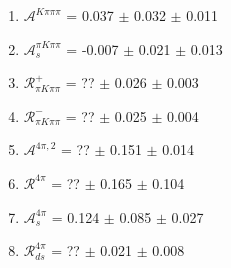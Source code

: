 \begin{enumerate}
\item $\mathcal{A}^{K\pi\pi\pi}$ = 0.037 $\pm$ 0.032 $\pm$ 0.011
\item $\mathcal{A}_s^{\pi K\pi\pi}$ = -0.007 $\pm$ 0.021 $\pm$ 0.013
\item $\mathcal{R}_{\pi K\pi\pi}^+$ = ?? $\pm$ 0.026 $\pm$ 0.003
\item $\mathcal{R}_{\pi K\pi\pi}^-$ = ?? $\pm$ 0.025 $\pm$ 0.004
\item $\mathcal{A}^{4\pi,2}$ = ?? $\pm$ 0.151 $\pm$ 0.014
\item $\mathcal{R}^{4\pi}$ = ?? $\pm$ 0.165 $\pm$ 0.104
\item $\mathcal{A}_s^{4\pi}$ = 0.124 $\pm$ 0.085 $\pm$ 0.027
\item $\mathcal{R}_{ds}^{4\pi}$ = ?? $\pm$ 0.021 $\pm$ 0.008
\end{enumerate}
